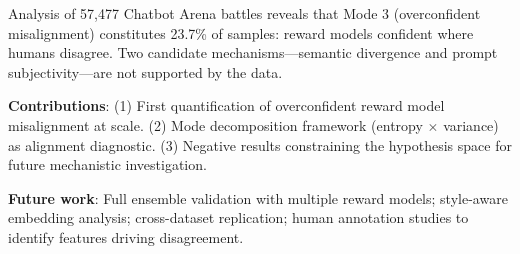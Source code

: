 
Analysis of 57,477 Chatbot Arena battles reveals that Mode 3 (overconfident misalignment) constitutes 23.7\% of samples: reward models confident where humans disagree. Two candidate mechanisms---semantic divergence and prompt subjectivity---are not supported by the data.

\textbf{Contributions}: (1) First quantification of overconfident reward model misalignment at scale. (2) Mode decomposition framework (entropy $\times$ variance) as alignment diagnostic. (3) Negative results constraining the hypothesis space for future mechanistic investigation.

\textbf{Future work}: Full ensemble validation with multiple reward models; style-aware embedding analysis; cross-dataset replication; human annotation studies to identify features driving disagreement.
